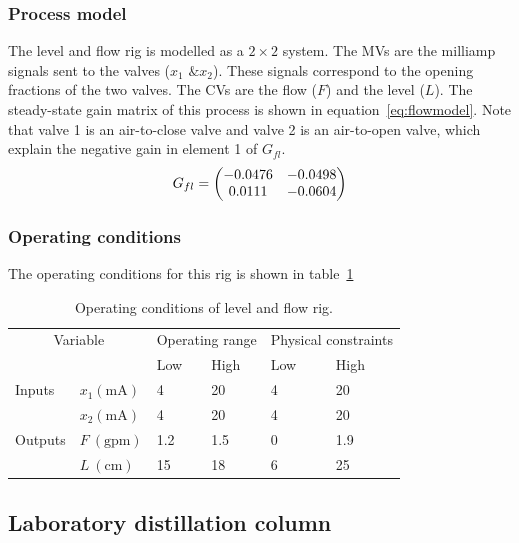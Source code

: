 \subsubsection{Process model}
The level and flow rig is modelled as a $2\times2$ system.
The MVs are the milliamp signals sent to the valves ($x_1\text{ \& }x_2$).
These signals correspond to the opening fractions of the two valves.
The CVs are the flow ($F$) and the level ($L$).
The steady-state gain matrix of this process is shown in equation~\ref{eq:flowmodel}.
Note that valve 1 is an air-to-close valve and valve 2 is an air-to-open valve, which explain the negative gain in element 1 of $G_{fl}$.
\begin{equation}
  \label{eq:flowmodel}
    G_{fl} = \bpm -0.0476 & -0.0498 \\      %
                  0.0111 & -0.0604 \\ \epm %
\end{equation}
\subsubsection{Operating conditions}
The operating conditions for this rig is shown in table~\ref{tab:flowopcon}
\begin{table}[htbp]
  \centering
  \begin{tabular}{llllll}
    \toprule
    \multicolumn{2}{c}{Variable} & \multicolumn{2}{c}{Operating range} & \multicolumn{2}{c}{Physical constraints} \\
    && Low & High & Low & High \\ 
    \midrule
    Inputs &$x_1 (\text{mA})$ & 4 & 20 & 4 & 20 \\
           &$x_2 (\text{mA})$ & 4 & 20 & 4 & 20 \\[1.3ex]
    Outputs &$F~(\text{gpm})$ & 1.2 & 1.5 & 0 & 1.9 \\
            &$L~(\text{cm})$  & 15 & 18 & 6 & 25 \\
    \bottomrule
  \end{tabular}
  \caption{Operating conditions of level and flow rig.}
  \label{tab:flowopcon}
\end{table}

\subsection{Laboratory distillation column}
